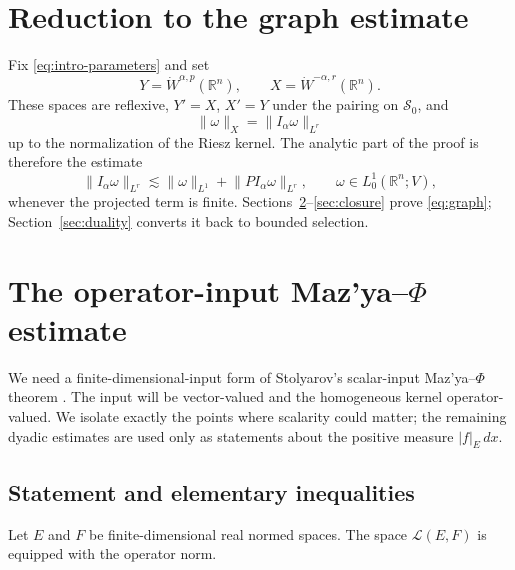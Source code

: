 \documentclass[11pt]{amsart}
\numberwithin{equation}{section}
\theoremstyle{definition}
\theoremstyle{remark}
\newcommand{\R}{\mathbb R}
\newcommand{\cS}{\mathcal S}
\newcommand{\cL}{\mathcal L}
\newcommand{\norm}[1]{\lVert #1\rVert}
\begin{document}
\section{Reduction to the graph estimate}\label{sec:graph}

Fix \eqref{eq:intro-parameters} and set
\begin{equation}\label{eq:XY}
 Y=\dot W^{\alpha,p}(\R^n),\qquad
 X=\dot W^{-\alpha,r}(\R^n).
\end{equation}
These spaces are reflexive,
$Y'=X$, $X'=Y$ under the pairing on $\cS_0$, and
\begin{equation}\label{eq:X-Riesz}
 \norm{\omega}_X=\norm{I_\alpha\omega}_{L^r}
\end{equation}
up to the normalization of the Riesz kernel.  The analytic part of the proof
is therefore the estimate
\begin{equation}\label{eq:graph}
 \norm{I_\alpha\omega}_{L^r}
 \lesssim \norm{\omega}_{L^1}+\norm{P I_\alpha\omega}_{L^r},
 \qquad
 \omega\in L^1_0(\R^n;V),
\end{equation}
whenever the projected term is finite.  Sections~\ref{sec:mazya}--\ref{sec:closure}
prove \eqref{eq:graph}; Section~\ref{sec:duality} converts it back to bounded
selection.

\section{The operator-input Maz'ya--\texorpdfstring{$\Phi$}{Phi} estimate}\label{sec:mazya}

We need a finite-dimensional-input form of Stolyarov's scalar-input
Maz'ya--$\Phi$ theorem \cite[Theorem~2.1]{Stolyarov24}.  The input will be
vector-valued and the homogeneous kernel operator-valued.  We isolate exactly
the points where scalarity could matter; the remaining dyadic estimates are
used only as statements about the positive measure $|f|_E\,dx$.

\subsection{Statement and elementary inequalities}
Let $E$ and $F$ be finite-dimensional real normed spaces.  The space
$\cL(E,F)$ is equipped with the operator norm.
\end{document}

